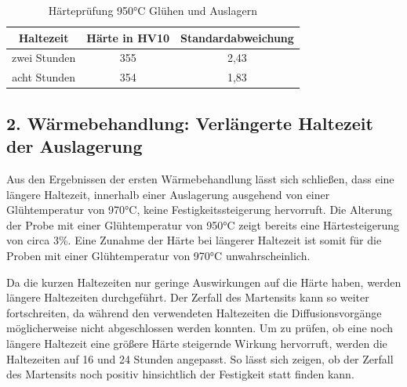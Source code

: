 \documentclass[a4paper, 11pt]{tubsreprt}
\begin{document}
\begin{table}[t] 	%
\begin{tabular}{c|c|c}
Haltezeit & Härte in HV10 & Standardabweichung \\
\hline
zwei Stunden	&	355 & 2,43 \\
\hline
acht Stunden & 354 & 1,83 \\
\end{tabular}
\caption{Härteprüfung 950°C Glühen und Auslagern}
\label{950alterung}
\end{table}



\newpage

\subsection{2. Wärmebehandlung: Verlängerte Haltezeit der Auslagerung}
Aus den Ergebnissen der ersten Wärmebehandlung lässt sich schließen, dass eine längere Haltezeit, innerhalb einer Auslagerung ausgehend von einer Glühtemperatur von 970°C, keine Festigkeitssteigerung hervorruft. Die Alterung der Probe mit einer Glühtemperatur von 950°C zeigt bereits eine Härtesteigerung von circa 3\%. Eine Zunahme der Härte bei längerer Haltezeit ist somit für die Proben mit einer Glühtemperatur von 970°C unwahrscheinlich. 

Da die kurzen Haltezeiten nur geringe Auswirkungen auf die Härte haben, werden längere Haltezeiten durchgeführt. Der Zerfall des Martensits kann so weiter fortschreiten, da während den verwendeten Haltezeiten die Diffusionsvorgänge möglicherweise nicht abgeschlossen werden konnten. Um zu prüfen, ob eine noch längere Haltezeit eine größere Härte steigernde Wirkung hervorruft, werden die Haltezeiten auf 16 und 24 Stunden angepasst. So lässt sich zeigen, ob der Zerfall des Martensits noch positiv hinsichtlich der Festigkeit statt finden kann. 
\end{document}
